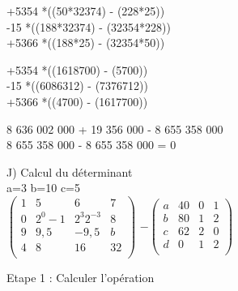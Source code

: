 \vspace{5mm} %

+5354 *((50*32374) - (228*25)) \\

-15 *((188*32374) - (32354*228)) \\

+5366 *((188*25) - (32354*50)) \\

\vspace{5mm} %

+5354 *((1618700) - (5700)) \\

-15 *((6086312) - (7376712)) \\

+5366 *((4700) - (1617700)) \\

\vspace{5mm} %

8 636 002 000 + 19 356 000 - 8 655 358 000 \\

8 655 358 000 - 8 655 358 000 = 0 \\

\newpage

J) Calcul du déterminant \\

a=3 b=10 c=5 \\

$
\begin{pmatrix}
  1 & 5 & 6 & 7 \\
  0 & 2^{0}-1 & 2^{3}2^{-3} & 8 \\
  9 & 9,5 & -9,5 & b \\
  4 & 8 & 16 & 32 \\
\end{pmatrix}
$
\vspace{5mm} %
$
-
\begin{pmatrix}
  a & 40 & 0 & 1 \\
  b & 80 & 1 & 2 \\
  c & 62 & 2 & 0 \\
  d & 0  & 1 & 2 \\
\end{pmatrix}
$
\vspace{5mm} %

Etape 1 :  Calculer l'opération \\


